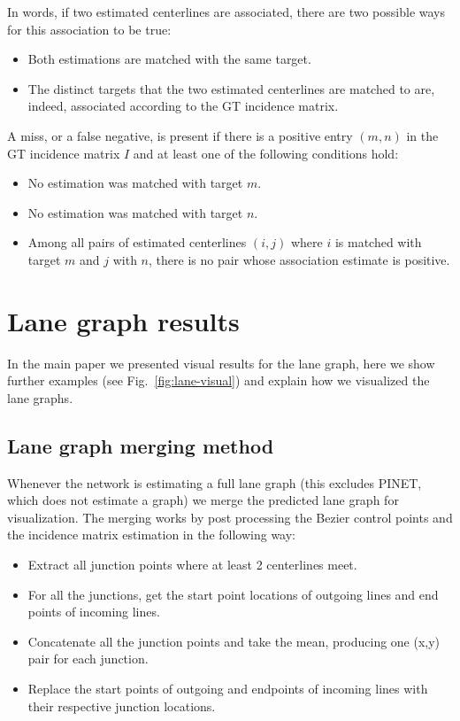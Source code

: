 \documentclass[10pt,twocolumn,letterpaper]{article}
\begin{document}
In words, if two estimated centerlines are associated, there are two possible ways for this association to be true:
\begin{itemize}
    \item Both estimations are matched with the same target.
    \item The distinct targets that the two estimated centerlines are matched to are, indeed, associated according to the GT incidence matrix.
\end{itemize}

A miss, or a false negative, is present if there is a positive entry $(m,n)$ in the GT incidence matrix $I$ and at least one of the following conditions hold: 
\begin{itemize}
    \item No estimation was matched with target $m$.
    \item No estimation was matched with target $n$.
    \item Among all pairs of estimated centerlines $(i,j)$ where $i$ is matched with target $m$ and $j$ with $n$, there is no pair whose association estimate is positive.
\end{itemize}











\section{Lane graph results}
In the main paper we presented visual results for the lane graph, here we show further examples (see Fig.~\ref{fig:lane-visual}) and explain how we visualized the lane graphs.

\subsection{Lane graph merging method}
Whenever the network is estimating a full lane graph (this excludes PINET, which does not estimate a graph) we merge the predicted lane graph for visualization. The merging works by post processing the Bezier control points and the incidence matrix estimation in the following way:
\begin{itemize}
    \item Extract all junction points where at least 2 centerlines meet.
    \item For all the junctions, get the start point locations of outgoing lines and end points of incoming lines.
    \item Concatenate all the junction points and take the mean, producing one (x,y) pair for each junction.
    \item Replace the start points of outgoing and endpoints of incoming lines with their respective junction locations.
\end{itemize}
\end{document}
